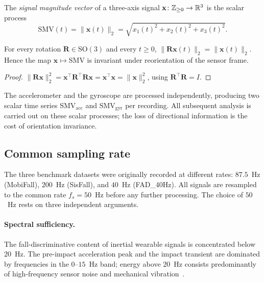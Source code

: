 \begin{definition}
\label{def:smv}
The \emph{signal magnitude vector} of a three-axis signal $\mathbf{x}\colon\mathbb{Z}_{\geq 0}\to\mathbb{R}^3$ is the scalar process
\begin{equation}
  \mathrm{SMV}(t)=\|\mathbf{x}(t)\|_2=\sqrt{x_1(t)^2+x_2(t)^2+x_3(t)^2}.
  \label{eq:smv}
\end{equation}
\end{definition}

\begin{proposition}
\label{prop:smv-invariance}
For every rotation $\mathbf{R}\in\mathrm{SO}(3)$ and every $t\geq 0$, $\|\mathbf{R}\mathbf{x}(t)\|_2=\|\mathbf{x}(t)\|_2$. Hence the map $\mathbf{x}\mapsto\mathrm{SMV}$ is invariant under reorientation of the sensor frame.
\end{proposition}

\begin{proof}
$\|\mathbf{R}\mathbf{x}\|_2^2=\mathbf{x}^\top\mathbf{R}^\top\mathbf{R}\mathbf{x}=\mathbf{x}^\top\mathbf{x}=\|\mathbf{x}\|_2^2$, using $\mathbf{R}^\top\mathbf{R}=I$.
\end{proof}

The accelerometer and the gyroscope are processed independently, producing two scalar time series $\mathrm{SMV}_{\mathrm{acc}}$ and $\mathrm{SMV}_{\mathrm{gyr}}$ per recording. All subsequent analysis is carried out on these scalar processes; the loss of directional information is the cost of orientation invariance.

\subsection{Common sampling rate}
\label{subsubsec:rate}

The three benchmark datasets were originally recorded at different rates: $87.5$~Hz (MobiFall), $200$~Hz (SisFall), and $40$~Hz (FAD\_40Hz). All signals are resampled to the common rate $f_s=50$~Hz before any further processing. The choice of $50$~Hz rests on three independent arguments.

\paragraph{Spectral sufficiency.} The fall-discriminative content of inertial wearable signals is concentrated below $20$~Hz. The pre-impact acceleration peak and the impact transient are dominated by frequencies in the $0$--$15$~Hz band; energy above $20$~Hz consists predominantly of high-frequency sensor noise and mechanical vibration~\parencite{sisfall,fallalld,kangas2008fall}.

